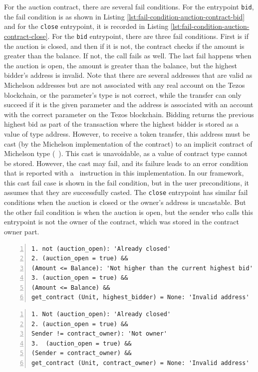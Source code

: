\documentclass[a4paper,UKenglish,cleveref, autoref, thm-restate]{lipics-v2021}
\begin{document}
For the auction contract, there are several fail conditions. For the entrypoint \lstinline/bid/, the fail condition is as shown in Listing \ref{lst:fail-condition-auction-contract-bid} and for the \lstinline/close/ entrypoint, it is recorded in Listing \ref{lst:fail-condition-auction-contract-close}. For the \lstinline/bid/ entrypoint, there are three fail conditions. First is if the auction is closed, and then if it is not, the contract checks if the amount is greater than the balance. If not, the call fails as well. The last fail happens when the auction is open, the amount is greater than the balance, but the highest bidder's address is invalid. Note that there are several addresses that are valid as Michelson addresses but are not associated with any real account on the Tezos blockchain, or the parameter's type is not correct, while the transfer can only succeed if it is the given parameter and the address is associated with an account with the correct parameter on the Tezos blockchain. Bidding returns the previous highest bid as part of the transaction where the highest bidder is stored as a value of type address. However, to receive a token transfer, this address must be cast (by the Michelson implementation of the contract) to an implicit contract of Michelson type (\TCONTRACT\ \TUNIT). This cast is unavoidable, as a value of contract type cannot be stored. However, the cast may fail, and its failure leads to an error condition that is reported with a \FAILWITH\ instruction in this implementation. In our framework, this cast fail case is shown in the fail condition, but in the user preconditions, it assumes that they are successfully casted. The \lstinline/close/ entrypoint has similar fail conditions when the auction is closed or the owner's address is uncastable. But the other fail condition is when the auction is open, but the sender who calls this entrypoint is not the owner of the contract, which was stored in the contract owner part.

\begin{lstlisting}[float,captionpos=b,caption={Fail condition for Auction contract bid entrypoint },label={lst:fail-condition-auction-contract-bid},numbers=left]
1. not (auction_open): 'Already closed'
2. (auction_open = true) &&
(Amount <= Balance): 'Not higher than the current highest bid'
3. (auction_open = true) &&
(Amount <= Balance) &&
get_contract (Unit, highest_bidder) = None: 'Invalid address' 
\end{lstlisting}

\begin{lstlisting}[float,captionpos=b,caption={Fail condition for Auction contract close entrypoint},label={lst:fail-condition-auction-contract-close},numbers=left]
1. Not (auction_open): 'Already closed'
2. (auction_open = true) &&
Sender != contract_owner): 'Not owner'
3.  (auction_open = true) &&
(Sender = contract_owner) &&
get_contract (Unit, contract_owner) = None: 'Invalid address'
\end{lstlisting}
\end{document}
